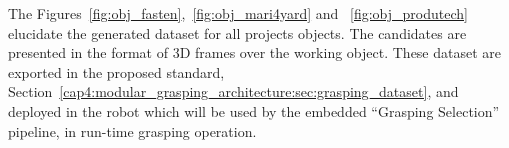 The Figures~\ref{fig:obj_fasten},~\ref{fig:obj_mari4yard} and ~\ref{fig:obj_produtech} elucidate the generated dataset for all projects objects. The candidates are presented in the format of 3D frames over the working object. These dataset are exported in the proposed standard, Section~\ref{cap4:modular_grasping_architecture:sec:grasping_dataset}, and deployed in the robot which will be used by the embedded ``Grasping Selection'' pipeline, in run-time grasping operation.

 \begin{figure}[h!]
\end{figure}
